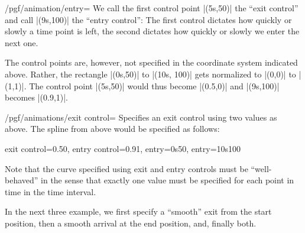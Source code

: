 \begin{key}{/pgf/animation/entry=}
  We call the first control point |(5s,50)| the ``exit control'' and
  call |(9s,100)| the ``entry control'': The first control dictates
  how quickly or slowly a time point is left, the second dictates how
  quickly or slowly we enter the next one.

  The control points are, however, not specified in the coordinate
  system indicated above. Rather, the rectangle |(0s,50)| to
  |(10s, 100)| gets normalized to |(0,0)| to |(1,1)|. The control
  point |(5s,50)| would thus become |(0.5,0)| and |(9s,100)| becomes
  |(0.9,1)|. 
  
  \begin{key}{/pgf/animations/exit control=}
    Specifies an exit control using two values as above. The spline
    from above would be specified as follows:

\begin{codeexample}
exit control={0.5}{0},
entry control={0.9}{1},
entry={0s}{50},
entry={10s}{100}
\end{codeexample}

    Note that the curve specified using exit and entry controls must
    be ``well-behaved'' in the sense that exactly one value must be
    specified for each point in time in the time interval.

    In the next three example, we first specify a ``smooth'' exit from
    the start position, then a smooth arrival at the end position,
    and, finally both.
    
\begin{codeexample}[width=2.3cm]
\end{codeexample}

\begin{codeexample}[width=2.3cm]
\end{codeexample}

\begin{codeexample}[width=2.3cm]
\end{codeexample}
  \end{key}


\end{key}

